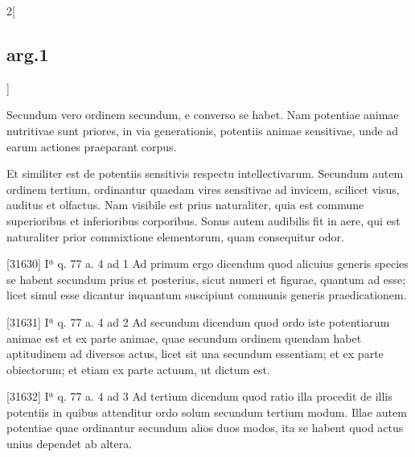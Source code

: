 \documentclass[paper=a4paper,fontsize=10pt,jafontsize=9pt,titlepage]{jlreq}
\begin{document}
\begin{paracol}{2}[\subsection{arg.1}]
 
\switchcolumn



\switchcolumn*


 Secundum vero ordinem secundum,
 e converso se habet. Nam potentiae animae nutritivae sunt priores, in
 via generationis, potentiis animae sensitivae, unde ad earum actiones
 praeparant corpus.


 
\switchcolumn



\switchcolumn*


 Et similiter est de potentiis sensitivis respectu
 intellectivarum. Secundum autem ordinem tertium, ordinantur quaedam
 vires sensitivae ad invicem, scilicet visus, auditus et olfactus. Nam
 visibile est prius naturaliter, quia est commune superioribus et
 inferioribus corporibus. Sonus autem audibilis fit in aere, qui est
 naturaliter prior commixtione elementorum, quam consequitur odor.

 
\switchcolumn



\switchcolumn*



[31630] Iª q. 77 a. 4 ad 1
 Ad primum ergo dicendum quod alicuius generis species se habent secundum prius et posterius, sicut numeri et figurae, quantum ad esse; licet simul esse dicantur inquantum suscipiunt communis generis praedicationem.

 
\switchcolumn



\switchcolumn*



[31631] Iª q. 77 a. 4 ad 2
 Ad secundum dicendum quod ordo iste potentiarum animae est et ex parte animae, quae secundum ordinem quendam habet aptitudinem ad diversos actus, licet sit una secundum essentiam; et ex parte obiectorum; et etiam ex parte actuum, ut dictum est.

 
\switchcolumn



\switchcolumn*



[31632] Iª q. 77 a. 4 ad 3
 Ad tertium dicendum quod ratio illa procedit de illis potentiis in quibus attenditur ordo solum secundum tertium modum. Illae autem potentiae quae ordinantur secundum alios duos modos, ita se habent quod actus unius dependet ab altera.

 
\switchcolumn


\end{paracol}
\end{document}
